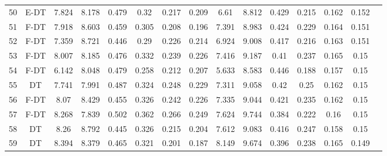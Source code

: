\begin{longtable}{@{\hskip3pt}c@{\hskip3pt}c@{\hskip3pt}c@{\hskip3pt}c@{\hskip3pt}c@{\hskip3pt}c@{\hskip3pt}c@{\hskip3pt}c@{\hskip3pt}c@{\hskip3pt}c@{\hskip3pt}c@{\hskip3pt}c@{\hskip3pt}c@{\hskip3pt}c@{\hskip3pt}c}
         50 &           E-DT &             7.824 &       8.178 &           0.479 &            0.32 &           0.217 &           0.209 &                6.61 &       8.812 &           0.429 &         0.215 &          0.162 &           0.152 \\
         51 &           F-DT &             7.918 &       8.603 &           0.459 &           0.305 &           0.208 &           0.196 &               7.391 &       8.983 &           0.424 &         0.229 &          0.164 &           0.151 \\
         52 &           F-DT &             7.359 &       8.721 &           0.446 &            0.29 &           0.226 &           0.214 &               6.924 &       9.008 &           0.417 &         0.216 &          0.163 &           0.151 \\
         53 &           F-DT &             8.007 &       8.185 &           0.476 &           0.332 &           0.239 &           0.226 &               7.416 &       9.187 &            0.41 &         0.237 &          0.165 &            0.15 \\
         54 &           F-DT &             6.142 &       8.048 &           0.479 &           0.258 &           0.212 &           0.207 &               5.633 &       8.583 &           0.446 &         0.188 &          0.157 &            0.15 \\
         55 &             DT &             7.741 &       7.991 &           0.487 &           0.324 &           0.248 &           0.229 &               7.311 &       9.058 &            0.42 &          0.25 &          0.162 &            0.15 \\
         56 &           F-DT &              8.07 &       8.429 &           0.455 &           0.326 &           0.242 &           0.226 &               7.335 &       9.044 &           0.421 &         0.235 &          0.162 &            0.15 \\
         57 &           F-DT &             8.268 &       7.839 &           0.502 &           0.362 &           0.266 &           0.249 &               7.624 &       9.744 &           0.384 &         0.222 &           0.16 &            0.15 \\
         58 &             DT &              8.26 &       8.792 &           0.445 &           0.326 &           0.215 &           0.204 &               7.612 &       9.083 &           0.416 &         0.247 &          0.158 &            0.15 \\
         59 &             DT &             8.394 &       8.379 &           0.465 &           0.321 &           0.201 &           0.187 &               8.149 &       9.674 &           0.396 &         0.238 &          0.165 &           0.149 \\

\end{longtable}
